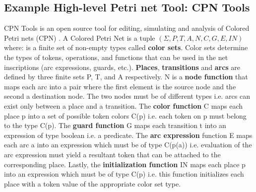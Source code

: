\subsection{Example High-level Petri net Tool: CPN Tools}

CPN Tools \cite{CPNTools} is an open source tool for editing, simulating and analysis of Colored Petri nets (CPN) \cite{CPN}. A Colored Petri Net is a tuple $(\Sigma, P, T, A, N, C, G, E, IN)$ where: \Sigma is a finite set of non-empty types called \textbf{color sets}. Color sets determine the types of tokens, operations, and functions that can be used in the net inscriptions (arc expressions, guards, etc.). \textbf{Places}, \textbf{transitions} and \textbf{arcs} are defined by three finite sets P, T, and A respectively. N is a \textbf{node function} that maps each arc into a pair where the first element is the source node and the second a destination node. The two nodes must be of different types i.e. arcs can exist only between a place and a transition. The \textbf{color function} C maps each place p into a set of possible token colors C(p) i.e. each token on p must belong to the type C(p). The \textbf{guard function} G maps each transition t into an expression of type boolean i.e. a predicate. The \textbf{arc expression} function E maps each arc a into an expression which must be of type C(p(a)) i.e. evaluation of the arc expression must yield a resultant token that can be attached to the corresponding place. Lastly, the \textbf{initialization function} IN maps each place p into an expression which must be of type C(p) i.e. this function initializes each place with a token value of the appropriate color set type. 

